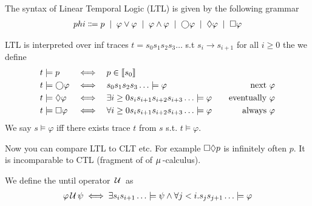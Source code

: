 \begin{definition}
    The syntax of Linear Temporal Logic (LTL) is given by the following grammar
    \begin{align*}
        phi \Coloneqq p \;\mid\;  
        \varphi \lor \varphi \;\mid\; 
        \varphi \land \varphi \;\mid\; 
        \bigcirc \varphi \;\mid\;  
        \lozenge \varphi 
        \;\mid\; \square \varphi
    \end{align*}
\end{definition}

\begin{definition}
LTL is interpreted over inf traces $t = s_0s_1s_2s_3\dots$ s.t $s_i \to s_{i+1}$ for all $i \geq 0$ the we define 
\begin{align*} 
&t \models p &\iff \quad&p \in \llbracket s_0 \rrbracket & \\
&t \models \bigcirc \varphi &\iff \quad&s_0s_1s_2s_3\dots \models \varphi & \quad \text{next $\varphi$}\\
&t \models \lozenge \varphi &\iff \quad&\exists i\geq0 s_is_{i+1}s_{i+2}s_{i+3}\dots \models \varphi & \quad \text{eventually $\varphi$}\\
&t \models \square \varphi &\iff \quad&\forall i\geq0 s_is_{i+1}s_{i+2}s_{i+3}\dots \models \varphi & \quad \text{always $\varphi$}\\
\end{align*}
We say $s \models \varphi$ iff there exists trace $t$ from $s$ s.t. $t \models \varphi$.
\end{definition}

\begin{remark}
    Now you can compare LTL to CLT etc. For example $\square \lozenge p$ is infinitely often $p$. It is incomparable to CTL (fragment of of $\mu\,$-calculus).
\end{remark}

\begin{definition}[Until]
We define the until operator $\,\mathcal{U}\,$ as 
\begin{align*}
    \varphi\,\mathcal{U}\,\psi \iff \exists s_is_{i+1}\dots \models \psi \land \forall j<i. s_js_{j+1}\dots\models \varphi
\end{align*}
\end{definition}



